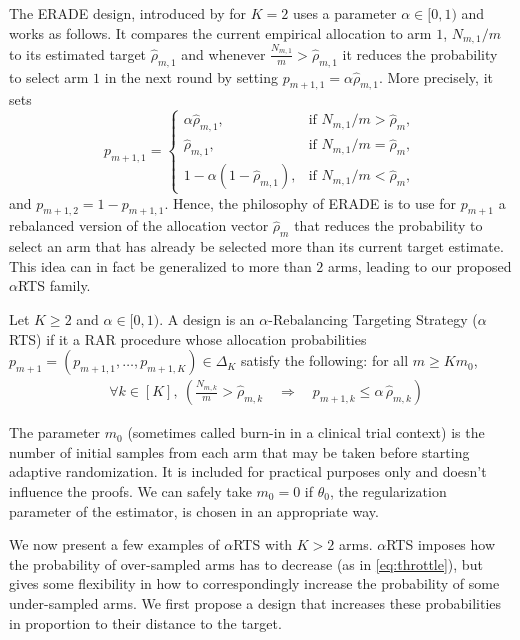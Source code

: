 The ERADE design, introduced by \cite{hu2009efficient} for $K=2$ uses a parameter $\alpha \in [0,1)$ and works as follows. It compares the current empirical allocation to arm $1$, $N_{m,1}/m$ to its estimated target $\hat{\rho}_{m,1}$ and whenever $\frac{N_{m,1}}{m}>\hat\rho_{m,1}$ it reduces the probability to select arm $1$ in the next round by setting $p_{m+1,1}=\alpha \hat\rho_{m,1}$.
More precisely, it sets
	\begin{equation*} \label{eq:erade}
		p_{m+1,1} =
		\begin{cases}
			\alpha \hat{\rho}_{m,1}, & \text{if } N_{m,1}/m > \hat{\rho}_m, \\[6pt]
			\hat{\rho}_{m,1}, & \text{if } N_{m,1}/m = \hat{\rho}_m, \\[6pt]
			1 - \alpha(1 - \hat{\rho}_{m,1}), & \text{if } N_{m,1}/m < \hat{\rho}_m,
		\end{cases}
	\end{equation*}
and $p_{m+1,2}=1-p_{m+1,1}$. Hence, the philosophy of ERADE is to use for $p_{m+1}$ a rebalanced version of the allocation vector $\hat{\rho}_m$ that reduces the probability to select an arm that has already be selected more than its current target estimate. This idea can in fact be generalized to more than $2$ arms, leading to our proposed $\alpha$RTS family.



\begin{definition} Let $K\geq 2$ and $\alpha\in[0,1)$. A design is an $\alpha$-Rebalancing Targeting Strategy ($\alpha$RTS) if it a RAR procedure whose allocation probabilities $p_{m+1}=(p_{m+1,1},\dots,p_{m+1,K}) \in \Delta_K$ satisfy the following: for all $m \geq Km_0$,
	\begin{align}
		&\forall k \in [K], \  \left(\frac{N_{m,k}}{m}>\hat\rho_{m,k}\quad \Longrightarrow\quad p_{m+1,k}\le \alpha\,\hat\rho_{m,k}\right) \label{eq:throttle}
	\end{align}
\end{definition}
\begin{remark}
	The parameter $m_0$ (sometimes called burn-in in a clinical trial context) is the number of initial samples from each arm that may be taken before starting adaptive randomization. It is included for practical purposes only and doesn't influence the proofs. We can safely take $m_0 = 0$ if $\theta_0$, the regularization parameter of the estimator, is chosen in an appropriate way.
\end{remark}
We now present a few examples of $\alpha$RTS with $K > 2$ arms. $\alpha$RTS imposes how the probability of over-sampled arms has to decrease (as in \eqref{eq:throttle}), but gives some flexibility in how to correspondingly increase the probability of some under-sampled arms. We first propose a design that increases these probabilities in proportion to their distance to the target.

